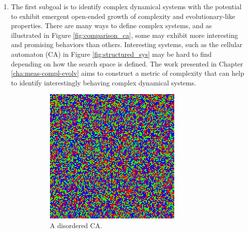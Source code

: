 \begin{enumerate}
  \item The first subgoal is to identify complex dynamical systems with the potential to exhibit
        emergent open-ended growth of complexity and evolutionary-like
        properties. There are many ways to define complex systems, and as
        illustrated in Figure \ref{fig:comparison_ca}, some may exhibit more
        interesting and promising behaviors than others. Interesting systems,
        such as the cellular automaton (CA) in Figure \ref{fig:structured_sys}
        may be hard to find depending on how the
        search space is defined. The work presented in Chapter
        \ref{cha:meas-compl-evolv} aims to construct a metric of complexity
        that can help to identify interestingly behaving complex
        dynamical systems.
\begin{figure}[htbp]
  \centering
\begin{subfigure}[t]{.4\linewidth}
  \centering
  \includegraphics[width=\linewidth]{figures/disord2.png}
  \caption{A disordered \acl{CA}.}
 \label{fig:disordered_sys}
\end{subfigure}
\hspace{30pt}
\begin{subfigure}[t]{.4\linewidth}
  \centering

\end{subfigure}
\end{figure}
\end{enumerate}
